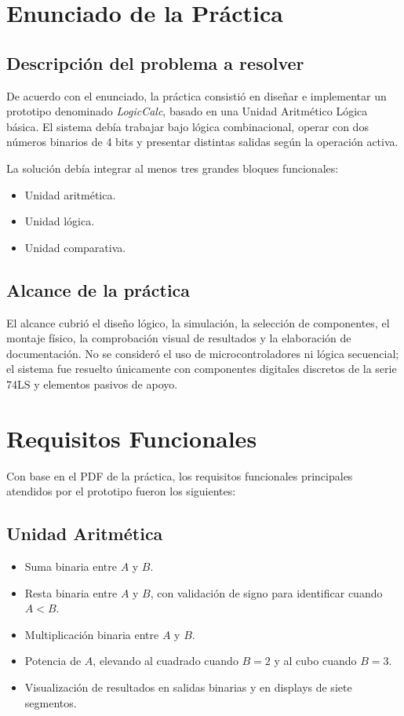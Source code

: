 \documentclass[12pt,a4paper]{article}
\begin{document}
\section{Enunciado de la Práctica}

\subsection{Descripción del problema a resolver}
De acuerdo con el enunciado, la práctica consistió en diseñar e implementar un prototipo denominado \textit{LogicCalc}, basado en una Unidad Aritmético Lógica básica. El sistema debía trabajar bajo lógica combinacional, operar con dos números binarios de 4 bits y presentar distintas salidas según la operación activa.

La solución debía integrar al menos tres grandes bloques funcionales:
\begin{itemize}[leftmargin=1.2cm]
    \item Unidad aritmética.
    \item Unidad lógica.
    \item Unidad comparativa.
\end{itemize}

\subsection{Alcance de la práctica}
El alcance cubrió el diseño lógico, la simulación, la selección de componentes, el montaje físico, la comprobación visual de resultados y la elaboración de documentación. No se consideró el uso de microcontroladores ni lógica secuencial; el sistema fue resuelto únicamente con componentes digitales discretos de la serie 74LS y elementos pasivos de apoyo.

\section{Requisitos Funcionales}
Con base en el PDF de la práctica, los requisitos funcionales principales atendidos por el prototipo fueron los siguientes:

\subsection{Unidad Aritmética}
\begin{itemize}[leftmargin=1.2cm]
    \item Suma binaria entre $A$ y $B$.
    \item Resta binaria entre $A$ y $B$, con validación de signo para identificar cuando $A < B$.
    \item Multiplicación binaria entre $A$ y $B$.
    \item Potencia de $A$, elevando al cuadrado cuando $B = 2$ y al cubo cuando $B = 3$.
    \item Visualización de resultados en salidas binarias y en displays de siete segmentos.
\end{itemize}
\end{document}
